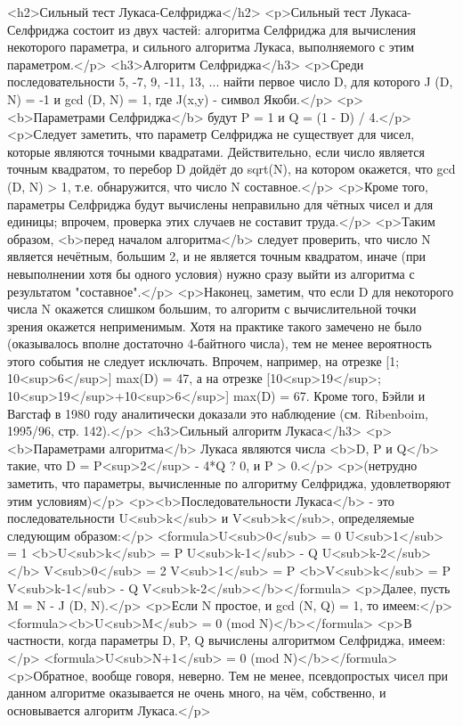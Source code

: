 <h2>Сильный тест Лукаса-Селфриджа</h2>
<p>Сильный тест Лукаса-Селфриджа состоит из двух частей: алгоритма Селфриджа для вычисления некоторого параметра, и сильного алгоритма Лукаса, выполняемого с этим параметром.</p>
<h3>Алгоритм Селфриджа</h3>
<p>Среди последовательности 5, -7, 9, -11, 13, ... найти первое число D, для которого J (D, N) = -1 и gcd (D, N) = 1, где J(x,y) - символ Якоби.</p>
<p><b>Параметрами Селфриджа</b> будут P = 1 и Q = (1 - D) / 4.</p>
<p>Следует заметить, что параметр Селфриджа не существует для чисел, которые являются точными квадратами. Действительно, если число является точным квадратом, то перебор D дойдёт до sqrt(N), на котором окажется, что gcd (D, N) > 1, т.е. обнаружится, что число N составное.</p>
<p>Кроме того, параметры Селфриджа будут вычислены неправильно для чётных чисел и для единицы; впрочем, проверка этих случаев не составит труда.</p>
<p>Таким образом, <b>перед началом алгоритма</b> следует проверить, что число N является нечётным, большим 2, и не является точным квадратом, иначе (при невыполнении хотя бы одного условия) нужно сразу выйти из алгоритма с результатом "составное".</p>
<p>Наконец, заметим, что если D для некоторого числа N окажется слишком большим, то алгоритм с вычислительной точки зрения окажется неприменимым. Хотя на практике такого замечено не было (оказывалось вполне достаточно 4-байтного числа), тем не менее вероятность этого события не следует исключать. Впрочем, например, на отрезке [1; 10<sup>6</sup>] max(D) = 47, а на отрезке [10<sup>19</sup>; 10<sup>19</sup>+10<sup>6</sup>] max(D) = 67. Кроме того, Бэйли и Вагстаф в 1980 году аналитически доказали это наблюдение (см. Ribenboim, 1995/96, стр. 142).</p>
<h3>Сильный алгоритм Лукаса</h3>
<p><b>Параметрами алгоритма</b> Лукаса являются числа <b>D, P и Q</b> такие, что D = P<sup>2</sup> - 4*Q ? 0, и P > 0.</p>
<p>(нетрудно заметить, что параметры, вычисленные по алгоритму Селфриджа, удовлетворяют этим условиям)</p>
<p><b>Последовательности Лукаса</b> - это последовательности U<sub>k</sub> и V<sub>k</sub>, определяемые следующим образом:</p>
<formula>U<sub>0</sub> = 0
U<sub>1</sub> = 1
<b>U<sub>k</sub> = P U<sub>k-1</sub> - Q U<sub>k-2</sub></b>
V<sub>0</sub> = 2
V<sub>1</sub> = P
<b>V<sub>k</sub> = P V<sub>k-1</sub> - Q V<sub>k-2</sub></b></formula>
<p>Далее, пусть M = N - J (D, N).</p>
<p>Если N простое, и gcd (N, Q) = 1, то имеем:</p>
<formula><b>U<sub>M</sub> = 0 (mod N)</b></formula>
<p>В частности, когда параметры D, P, Q вычислены алгоритмом Селфриджа, имеем:</p>
<formula>U<sub>N+1</sub> = 0 (mod N)</b></formula>
<p>Обратное, вообще говоря, неверно. Тем не менее, псевдопростых чисел при данном алгоритме оказывается не очень много, на чём, собственно, и основывается алгоритм Лукаса.</p>
